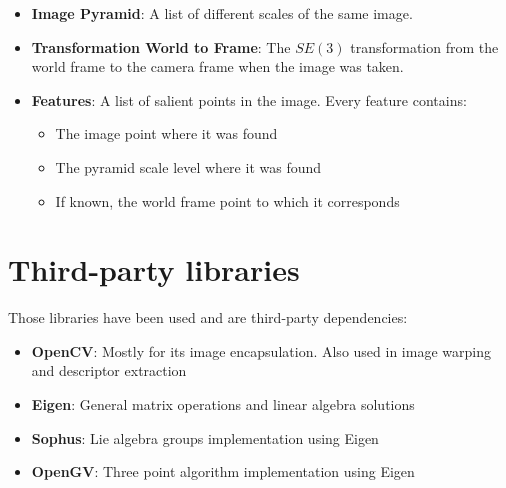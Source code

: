\begin{itemize}
  \item \textbf{Image Pyramid}: A list of different scales of the same image.
  \item \textbf{Transformation World to Frame}: The $SE(3)$ transformation from the world frame to the camera frame when the image was taken.
  \item \textbf{Features}: A list of salient points in the image. Every feature contains:
    \begin{itemize}
      \item The image point where it was found
      \item The pyramid scale level where it was found
      \item If known, the world frame point to which it corresponds
    \end{itemize}
\end{itemize}

\section{Third-party libraries}
\label{sec:third_party_libraries}

Those libraries have been used and are third-party dependencies:

\begin{itemize}
  \item \textbf{OpenCV}: Mostly for its image encapsulation. Also used in image warping and descriptor extraction

  \item \textbf{Eigen}: General matrix operations and linear algebra solutions

  \item \textbf{Sophus}: Lie algebra groups implementation using Eigen

  \item \textbf{OpenGV}: Three point algorithm implementation using Eigen
\end{itemize}

